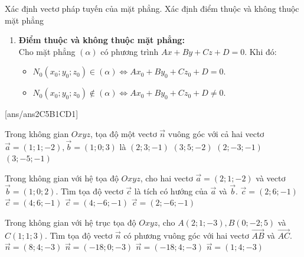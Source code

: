 \begin{dang}{Xác định vectơ pháp tuyến của mặt phẳng. Xác định điểm thuộc và không thuộc mặt phẳng}
\begin{enumerate}[label=\bf\arabic*.]
\begin{itemize}
	\end{itemize}
		\item \textbf{Điểm thuộc và không thuộc mặt phẳng:}\\
		Cho mặt phẳng $(\alpha)$ có phương trình $A x+B y+C z+D=0$. Khi đó: 
		\begin{itemize}
		\item $N_0\left(x_0; y_0; z_0\right) \in(\alpha) \Leftrightarrow A x_0+B y_0+C z_0+D=0$.
		\item $N_0\left(x_0; y_0; z_0\right) \notin(\alpha) \Leftrightarrow A x_0+B y_0+C z_0+D \neq 0$.	
		\end{itemize}
	\end{enumerate}
\end{dang}

\TN
{}[ans/ans2C5B1CD1]
\begin{ex}%
	Trong không gian $O x y z$, tọa độ một vectơ $\overrightarrow{n}$ vuông góc với cả hai vectơ $\overrightarrow{a}=(1; 1;-2), \overrightarrow{b}=(1; 0; 3)$ là
	\choice
	{$(2; 3;-1)$}
	{$(3; 5;-2)$}
	{$(2;-3;-1)$}
	{\True $(3;-5;-1)$}
\end{ex}

\begin{ex}%
	Trong không gian với hệ tọa độ $O x y z$, cho hai vectơ $\overrightarrow{a}=(2; 1;-2)$ và vectơ $\overrightarrow{b}=(1; 0; 2)$. Tìm tọa độ vectơ $\overrightarrow{c}$ là tích có hướng của $\overrightarrow{a}$ và $\overrightarrow{b}$.
	\choice
	{$\overrightarrow{c}=(2; 6;-1)$}
	{$\overrightarrow{c}=(4; 6;-1)$}
	{$\overrightarrow{c}=(4;-6;-1)$}
	{\True $\overrightarrow{c}=(2;-6;-1)$}
\end{ex}

\begin{ex}%
	Trong không gian với hệ trục tọa độ $O x y z$, cho $A(2; 1;-3), B(0;-2; 5)$ và $C(1; 1; 3)$. Tìm tọa độ vectơ $\overrightarrow{n}$ có phương vuông góc với hai vectơ $\overrightarrow{A B}$ và $\overrightarrow{A C}$.
	\choice
	{$\overrightarrow{n}=(8; 4;-3)$}
	{$\overrightarrow{n}=(-18; 0;-3)$}
	{\True $\overrightarrow{n}=(-18; 4;-3)$}
	{$\overrightarrow{n}=(1; 4;-3)$}
\end{ex}

